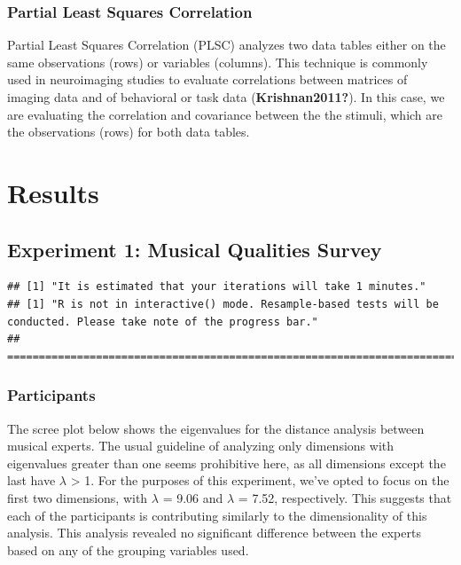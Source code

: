\documentclass[
  english,
  man,floatsintext]{apa6}
\begin{document}
\hypertarget{partial-least-squares-correlation}{%
\subsubsection{Partial Least Squares Correlation}\label{partial-least-squares-correlation}}

Partial Least Squares Correlation (PLSC) analyzes two data tables either on the same observations (rows) or variables (columns). This technique is commonly used in neuroimaging studies to evaluate correlations between matrices of imaging data and of behavioral or task data (\textbf{Krishnan2011?}). In this case, we are evaluating the correlation and covariance between the the stimuli, which are the observations (rows) for both data tables.

\hypertarget{results}{%
\section{Results}\label{results}}

\hypertarget{experiment-1-musical-qualities-survey}{%
\subsection{Experiment 1: Musical Qualities Survey}\label{experiment-1-musical-qualities-survey}}

\begin{verbatim}
## [1] "It is estimated that your iterations will take 1 minutes."
## [1] "R is not in interactive() mode. Resample-based tests will be conducted. Please take note of the progress bar."
## ================================================================================
\end{verbatim}

\hypertarget{participants-1}{%
\subsubsection{Participants}\label{participants-1}}

The scree plot below shows the eigenvalues for the distance analysis between musical experts. The usual guideline of analyzing only dimensions with eigenvalues greater than one seems prohibitive here, as all dimensions except the last have \(\lambda\) \textgreater{} 1. For the purposes of this experiment, we've opted to focus on the first two dimensions, with \(\lambda\) = 9.06 and \(\lambda\) = 7.52, respectively. This suggests that each of the participants is contributing similarly to the dimensionality of this analysis. This analysis revealed no significant difference between the experts based on any of the grouping variables used.
\end{document}
